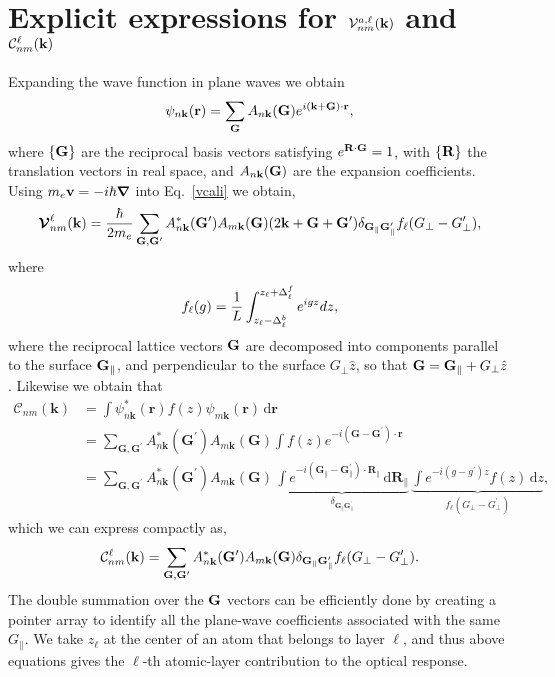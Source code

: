 \section{Explicit expressions for 
\texorpdfstring{${\cal V}^{a,\ell}_{nm}(\mathbf{k})$ 
and 
${\cal C}^{\ell}_{nm}(\mathbf{k})$}{Vnm and Cnm}}\label{calpcalc}

Expanding the wave function in plane waves we obtain
\begin{align}\label{eni.1}
\psi_{n\mathbf{k}}(\mathbf{r})=\sum_{\mathbf{G}} A_{n\mathbf{k}}(\mathbf{G})e^{i(\mathbf{k}+\mathbf{G})\cdot\mathbf{r}}
,
\end{align}
where $\{\mathbf{G}\}$ are the reciprocal basis vectors satisfying
$e^{\mathbf{R}\cdot\mathbf{G}}=1$, with $\{\mathbf{R}\}$ the translation vectors in real
space, and $A_{n\mathbf{k}}(\mathbf{G})$ are the expansion coefficients. Using
$m_e\mathbf{v}=-i\hbar\boldsymbol{\nabla}$ into Eq.~\eqref{vcali} we obtain,\cite{mendozaPRB06}
\begin{align}\label{eni.2}
\boldsymbol{\mathcal{\cal V}}^\ell_{nm}(\mathbf{k})=
\frac{\hbar}{2m_e}
\sum_{\mathbf{G},\mathbf{G}'} A^*_{n\mathbf{k}}(\mathbf{G}')  A_{m\mathbf{k}}(\mathbf{G})
(2\mathbf{k}+\mathbf{G}+\mathbf{G}')
\delta_{\mathbf{G}_\parallel \mathbf{G}'_\parallel}  
f_\ell(G_\perp-G'_\perp)
,
\end{align}   
where
\begin{align}\label{eni.3}
f_\ell(g)=\frac{1}{L}\int_{z_\ell-\Delta^b_\ell}^{z_\ell+\Delta^f_\ell} e^{igz}dz
,
\end{align}
where the reciprocal lattice vectors $\mathbf{G}$ are decomposed into components
parallel to the surface $\mathbf{G}_\parallel$, and perpendicular to the
surface $G_\perp \hat z$, so
that $\mathbf{G} = \mathbf{G}_\parallel + G_\perp\hat z$.
Likewise we obtain that
\begin{align*}
\mathcal{C}_{nm}(\mathbf{k})
&=  \int\psi^{*}_{n\mathbf{k}}(\mathbf{r})f(z)
    \psi_{m\mathbf{k}}(\mathbf{r})\,\text{d}\mathbf{r}\\
&=  \sum_{\mathbf{G},\mathbf{G^{\prime}}}
    A^{*}_{n\mathbf{k}}(\mathbf{G^{\prime}})
    A_{m\mathbf{k}}(\mathbf{G})
    \int f(z)e^{-i(\mathbf{G}-\mathbf{G^{\prime}})\cdot\mathbf{r}}\\
&=  \sum_{\mathbf{G},\mathbf{G^{\prime}}}
    A^{*}_{n\mathbf{k}}(\mathbf{G^{\prime}})
    A_{m\mathbf{k}}(\mathbf{G})
    \,\underbrace{
    \int e^{-i(\mathbf{G}_{\parallel}-\mathbf{G}^{\prime}_{\parallel})
    \cdot\mathbf{R}_{\parallel}}\,\text{d}\mathbf{R}_{\parallel}
    }_{\delta_{\mathbf{G}_{\parallel}\mathbf{G}^{\prime}_{\parallel}}}
    \,\underbrace{
    \int e^{-i(g-g^{\prime})z}f(z)\,\text{d}z
    }_{f_{\ell}(G_{\perp} - G^{\prime}_{\perp})},
\end{align*}
which we can express compactly as,
\begin{align}\label{eni.4}
{\mathbf{\cal C}}^\ell_{nm}(\mathbf{k})=
\sum_{\mathbf{G},\mathbf{G}'} A^*_{n\mathbf{k}}(\mathbf{G}')  A_{m\mathbf{k}}(\mathbf{G})
\delta_{\mathbf{G}_\parallel \mathbf{G}'_\parallel} 
f_\ell(G_\perp-G'_\perp)
.
\end{align}  
The double summation over the $\mathbf{G}$ vectors can be efficiently done by
creating a pointer array to identify all the plane-wave coefficients
associated with the same $G_\parallel$. We take $z_\ell$
 at the center of an atom that
belongs to layer $\ell$, and thus above equations gives the $\ell$-th
 atomic-layer
contribution to the optical response.\cite{mendozaPRB06} 

